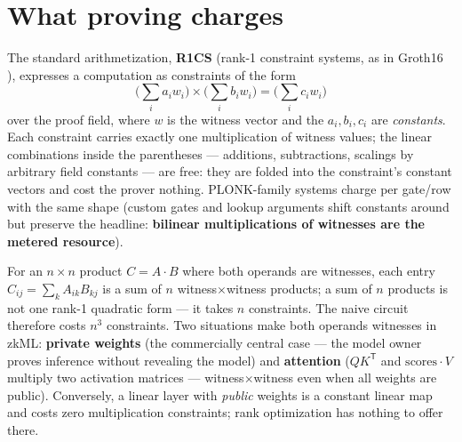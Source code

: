\documentclass[10pt]{article}
\begin{document}
\section{What proving charges}\label{sec:cost}

The standard arithmetization, \textbf{R1CS} (rank-1 constraint
systems, as in Groth16 \cite{groth16}), expresses a computation as
constraints of the form
\[
\Big( \textstyle\sum_i a_i w_i \Big) \times
\Big( \textstyle\sum_i b_i w_i \Big) =
\Big( \textstyle\sum_i c_i w_i \Big)
\]
over the proof field, where $w$ is the witness vector and the $a_i,
b_i, c_i$ are \emph{constants}. Each constraint carries exactly one
multiplication of witness values; the linear combinations inside the
parentheses --- additions, subtractions, scalings by arbitrary field
constants --- are free: they are folded into the constraint's
constant vectors and cost the prover nothing. PLONK-family systems
\cite{plonk} charge per gate/row with the same shape (custom gates
and lookup arguments shift constants around but preserve the
headline: \textbf{bilinear multiplications of witnesses are the
metered resource}).

For an $n\times n$ product $C = A\cdot B$ where both operands are
witnesses, each entry $C_{ij} = \sum_k A_{ik}B_{kj}$ is a sum of $n$
witness$\times$witness products; a sum of $n$ products is not one
rank-1 quadratic form --- it takes $n$ constraints. The naive circuit
therefore costs $n^3$ constraints. Two situations make both operands
witnesses in zkML: \textbf{private weights} (the commercially central
case --- the model owner proves inference without revealing the
model) and \textbf{attention} ($QK^{\mathsf T}$ and
$\mathrm{scores}\cdot V$ multiply two activation matrices ---
witness$\times$witness even when all weights are public).
Conversely, a linear layer with \emph{public} weights is a constant
linear map and costs zero multiplication constraints; rank
optimization has nothing to offer there.
\end{document}
